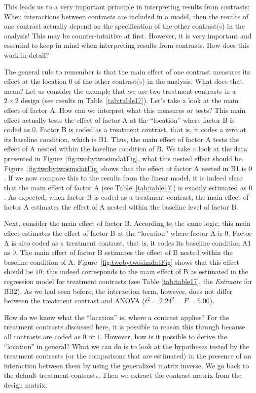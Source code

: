 \documentclass[12pt,]{krantz}
\theoremstyle{definition}
\theoremstyle{definition}
\theoremstyle{definition}
\theoremstyle{remark}
\begin{document}
This leads us to a very important principle in interpreting results from
contrasts: When interactions between contrasts are included in a model,
then the results of one contrast actually depend on the specification of
the other contrast(s) in the analysis! This may be counter-intuitive at
first. However, it is very important and essential to keep in mind when
interpreting results from contrasts. How does this work in detail?

The general rule to remember is that the main effect of one contrast
measures its effect at the location \(0\) of the other contrast(s) in
the analysis. What does that mean? Let us consider the example that we
use two treatment contrasts in a \(2 \times 2\) design (see results in
Table~\ref{tab:table17}). Let's take a look at the main effect of factor
A. How can we interpret what this measures or tests? This main effect
actually tests the effect of factor A at the ``location'' where factor B
is coded as \(0\). Factor B is coded as a treatment contrast, that is,
it codes a zero at its baseline condition, which is B1. Thus, the main
effect of factor A tests the effect of A nested within the baseline
condition of B. We take a look at the data presented in
Figure~\ref{fig:twobytwosimdatFig}, what this nested effect should be.
Figure~\ref{fig:twobytwosimdatFig} shows that the effect of factor A
nested in B1 is \(0\). If we now compare this to the results from the
linear model, it is indeed clear that the main effect of factor A (see
Table~\ref{tab:table17}) is exactly estimated as \(0\). As expected,
when factor B is coded as a treatment contrast, the main effect of
factor A estimates the effect of A nested within the baseline level of
factor B.

Next, consider the main effect of factor B. According to the same logic,
this main effect estimates the effect of factor B at the ``location''
where factor A is \(0\). Factor A is also coded as a treatment contrast,
that is, it codes its baseline condition A1 as \(0\). The main effect of
factor B estimates the effect of B nested within the baseline condition
of A. Figure~\ref{fig:twobytwosimdatFig} shows that this effect should
be \(10\); this indeed corresponds to the main effect of B as estimated
in the regression model for treatment contrasts (see Table
\ref{tab:table17}, the \emph{Estimate} for BB2). As we had seen before,
the interaction term, however, does not differ between the treatment
contrast and ANOVA (\(t^2 = 2.24^2 = F = 5.00\)).

How do we know what the ``location'' is, where a contrast applies? For
the treatment contrasts discussed here, it is possible to reason this
through because all contrasts are coded as \(0\) or \(1\). However, how
is it possible to derive the ``location'' in general? What we can do is
to look at the hypotheses tested by the treatment contrasts (or the
comparisons that are estimated) in the presence of an interaction
between them by using the generalized matrix inverse. We go back to the
default treatment contrasts. Then we extract the contrast matrix from
the design matrix:
\end{document}

